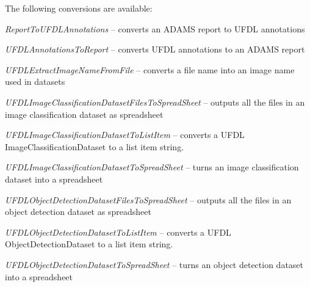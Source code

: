 \documentclass[a4paper]{book}
\begin{document}
The following conversions are available:
\begin{tight_itemize}
  \item \textit{ReportToUFDLAnnotations} -- converts an ADAMS report to UFDL annotations
  \item \textit{UFDLAnnotationsToReport} -- converts UFDL annotations to an ADAMS report
  \item \textit{UFDLExtractImageNameFromFile} -- converts a file name into an image name used in datasets
  \item \textit{UFDLImageClassificationDatasetFilesToSpreadSheet} -- outputs all the files in an image classification dataset as spreadsheet
  \item \textit{UFDLImageClassificationDatasetToListItem} -- converts a UFDL ImageClassificationDataset to a list item string.
  \item \textit{UFDLImageClassificationDatasetToSpreadSheet} -- turns an image classification dataset into a spreadsheet
  \item \textit{UFDLObjectDetectionDatasetFilesToSpreadSheet} -- outputs all the files in an object detection dataset as spreadsheet
  \item \textit{UFDLObjectDetectionDatasetToListItem} -- converts a UFDL ObjectDetectionDataset to a list item string.
  \item \textit{UFDLObjectDetectionDatasetToSpreadSheet} -- turns an object detection dataset into a spreadsheet
\end{tight_itemize}
\end{document}
